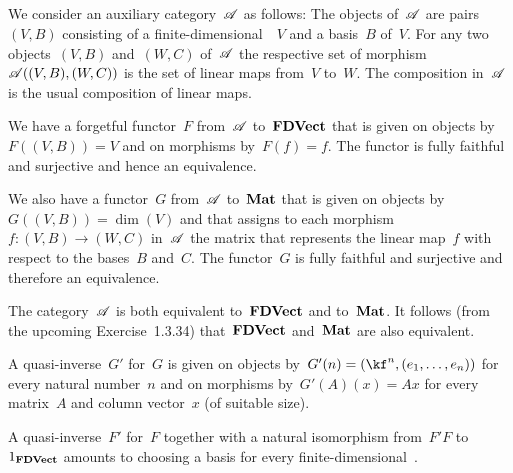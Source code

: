 \subsection{}

We consider an auxiliary category~$\mathscr{A}$ as follows:
The objects of~$\mathscr{A}$ are pairs~$(V, B)$ consisting of a finite-dimensional~\vectorspace{$\kf$}~$V$ and a basis~$B$ of~$V$.
For any two objects~$(V, B)$ and~$(W, C)$ of~$\mathscr{A}$ the respective set of morphism~$\mathscr{A}( (V, B), (W, C) )$ is the set of linear maps from~$V$ to~$W$.
The composition in~$\mathscr{A}$ is the usual composition of linear maps.

We have a forgetful functor~$F$ from~$\mathscr{A}$ to~$\mathbf{FDVect}$ that is given on objects by~$F((V, B)) = V$ and on morphisms by~$F(f) = f$.
The functor is fully faithful and surjective and hence an equivalence.

We also have a functor~$G$ from~$\mathscr{A}$ to~$\mathbf{Mat}$ that is given on objects by~$G( (V, B) ) = \dim(V)$ and that assigns to each morphism~$f \colon (V, B) \to (W, C)$ in~$\mathscr{A}$ the matrix that represents the linear map~$f$ with respect to the bases~$B$ and~$C$.
The functor~$G$ is fully faithful and surjective and therefore an equivalence.

The category~$\mathscr{A}$ is both equivalent to~$\mathbf{FDVect}$ and to~$\mathbf{Mat}$.
It follows (from the upcoming Exercise~1.3.34) that~$\mathbf{FDVect}$ and~$\mathbf{Mat}$ are also equivalent.

A quasi-inverse~$G'$ for~$G$ is given on objects by~$G'(n) = (\kf^n, (e_1, \dotsc, e_n))$ for every natural number~$n$ and on morphisms by~$G'(A)(x) = Ax$ for every matrix~$A$ and column vector~$x$ (of suitable size).

A quasi-inverse~$F'$ for~$F$ together with a natural isomorphism from~$F' F$ to~$1_{\mathbf{FDVect}}$ amounts to choosing a basis for every finite-dimensional~\vectorspace{$\kf$}.

